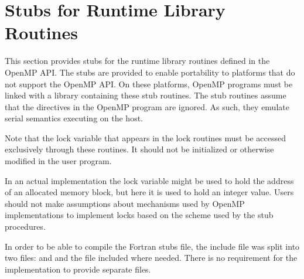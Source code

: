 \chapter{Stubs for Runtime Library Routines}
\label{chap:Stubs for Runtime Library Routines}
\label{chap:Appendix A}
This section provides stubs for the runtime library routines defined in the OpenMP API.
The stubs are provided to enable portability to platforms that do not support the
OpenMP API. On these platforms, OpenMP programs must be linked with a library
containing these stub routines. The stub routines assume that the directives in the
OpenMP program are ignored. As such, they emulate serial semantics
executing on the host.

Note that the lock variable that appears in the lock routines must be accessed
exclusively through these routines. It should not be initialized or otherwise modified in
the user program.

In an actual implementation the lock variable might be used to hold the address of an
allocated memory block, but here it is used to hold an integer value. Users should not
make assumptions about mechanisms used by OpenMP implementations to implement
locks based on the scheme used by the stub procedures.

\begin{fortranspecific}

In order to be able to compile the Fortran stubs file, the include file
 was split into two files:  and  and the
 file included where needed. There is no requirement for the
implementation to provide separate files.

\end{fortranspecific}


\pagebreak



